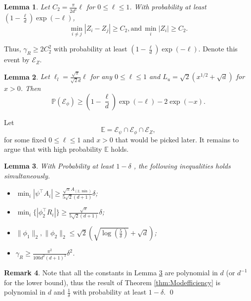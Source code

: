 \documentclass[twoside]{article}
\newcommand{\Epsi}{\mathcal{E}_{\psi}}
\newcommand{\Ephi}{\mathcal{E}_{\phi}}
\newcommand{\EZ}{\mathcal{E}_{Z}}
\newcommand{\E}{\mathbb{E}}
\newcommand{\Prob}[1]{\mathbb{P}\left(#1\right)}
\newtheorem{lemma}{Lemma}[section]
\theoremstyle{definition}
\newtheorem{remark}[lemma]{Remark}
\begin{document}
\begin{lemma}
\label{lem:CauchyGap}
Let $C_2 = \frac{\pi}{2d^2}\ell$ for $0\le \ell\le 1$. 
With probability at least $\left(1- \frac{\ell}{d}\right)\exp(-\ell)$,
\[
\min_{i\neq j} \left\vert Z_i - Z_j \right\vert \ge C_2, \text{and} \,  \min_i\vert Z_i\vert \ge C_2.
\]
\end{lemma}
Thus, $\gamma_R \ge 2C_2^2$ with probability at least $\left(1- \frac{\ell}{d}\right)\exp(-\ell)$.
Denote this event by $\EZ$.
\begin{lemma}
\label{lem:EventphiProb}
Let $\ell_l = \frac{\sqrt{\pi}}{\sqrt{2}d}\ell$ for any $0\le \ell\le 1$ and $ L_u = \sqrt{2}\left(x^{1/2}+\sqrt{d}\right)$ for $x>0$. Then
\[
\Prob{\Ephi} \ge \left(1- \frac{\ell}{d}\right)\exp(-\ell) - 2\exp(-x).
\]
\end{lemma}
Let  
\[
\E = \Epsi \cap\Ephi \cap \EZ,
\]
for some fixed $0\le \ell\le 1$ and $x>0$ that would be picked later.
It remains to argue that with high probability $\E$ holds.
\begin{lemma}
\label{lem:ConstantProb}
With Probability at least $1-\delta$ , the following inequalities holds simultaneously.
\begin{itemize}
\vspace{-3mm}
\item $\min_i |\psi^{\top}A_i| \ge \frac{\sqrt{\pi}A_{(2,\min)}}{5\sqrt{2}(d+1)} \delta$;
\item $\min_i \{|\phi_2^{\top}R_i|\} \ge \frac{\sqrt{\pi}}{5\sqrt{2}(d+1)}\delta$;
\item $\|\phi_1\|_2, \|\phi_2\|_2 \le \sqrt{2}\left(\sqrt{\log(\frac{5}{\delta})}+\sqrt{d}\right)$;
\item $\gamma_R \ge\frac{\pi^2}{100d^2(d+1)^2}\delta^2$.
\end{itemize}
\vspace{-2mm}
\end{lemma}
\begin{remark}
Note that all the constants in Lemma \ref{lem:ConstantProb} are polynomial in $d$ (or $d^{-1}$ for the lower bound), thus the result of Theorem \ref{thm:Modefficiency} is polynomial in $d$ and $\frac{1}{\delta}$ with probability at least $1-\delta$. \qed
\end{remark}
\end{document}
